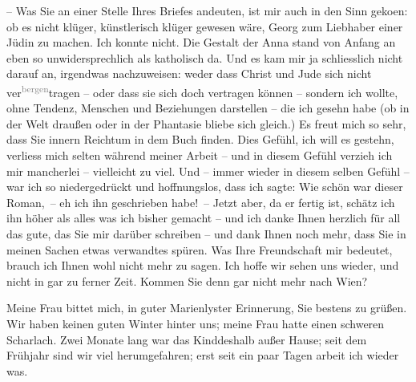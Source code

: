 \pstart
           – Was Sie an einer Stelle Ihres Briefes andeuten, ist mir auch in den Sinn geko{\geminationm}en: ob es nicht klüger, künstlerisch klüger gewesen
               wäre, Georg zum Liebhaber
               einer Jüdin zu machen. Ich konnte nicht. Die Gestalt der Anna stand von Anfang an eben so
               unwidersprechlich als katholisch da. Und es kam mir ja schliesslich nicht darauf an,
               irgendwas nachzuweisen: weder dass Christ und Jude sich nicht ver\substVorne{}\textsuperscript{\textcolor{gray}{bergen}}\substDazwischen{}tragen\substHinten{} – oder dass sie sich doch vertragen können – sondern ich wollte, ohne
               Tendenz, {\pb}Menschen und Beziehungen darstellen –
               die ich gesehn habe (ob in der Welt draußen oder in der Phantasie bliebe sich
               gleich.)  Es freut mich so sehr, dass Sie
               innern Reichtum in dem Buch
               finden. Dies Gefühl, ich will es gestehn, verliess mich selten während meiner Arbeit
               – und in diesem Gefühl verzieh ich mir mancherlei – vielleicht zu viel. Und \introOben{}–\introOben{} immer wieder in diesem selben Gefühl – war ich so
               niedergedrückt und hoffnungslos, dass ich sagte: Wie schön war dieser Roman, – eh ich
               ihn geschrieben habe! – Jetzt aber, da er fertig ist, schätz ich ihn höher als alles
               was ich bisher gemacht – und ich danke Ihnen herzlich für all das gute, das Sie mir
                  {\pb}darüber schreiben – und dank Ihnen noch mehr,
               dass Sie in meinen Sachen etwas verwandtes spüren. Was Ihre Freundschaft mir
               bedeutet, brauch ich Ihnen wohl nicht mehr zu sagen. Ich hoffe wir sehen uns wieder,
               und nicht in gar zu ferner Zeit. Kommen Sie denn gar nicht mehr nach Wien?\pend
           
\pstart
           Meine Frau bittet mich, in
               guter Marienlyster Erinnerung, Sie bestens zu
               grüßen. Wir haben keinen guten Winter hinter uns; meine Frau hatte einen schweren Scharlach. Zwei
               Monate lang war das Kind\introOben{}deshalb\introOben{} außer Hause; seit dem Frühjahr sind wir viel
               herumgefahren; erst seit ein paar Tagen arbeit ich wieder was.\pend
           
